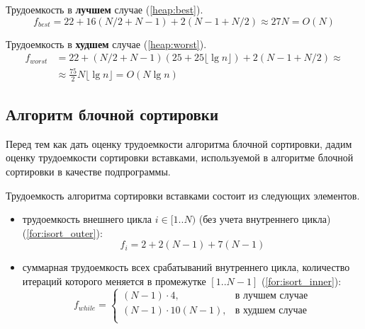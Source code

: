 Трудоемкость в \textbf{лучшем} случае (\ref{heap:best}).
\begin{equation}
	\label{heap:best}
	f_{best} = 22 + 16(N/2 + N - 1) + 2(N-1+N/2) \approx 27N = O(N)
\end{equation}

Трудоемкость в \textbf{худшем} случае (\ref{heap:worst}).
\begin{equation}
	\begin{split}
		\label{heap:worst}
		f_{worst} &=  22 + (N/2 + N - 1)(25 + 25\lfloor \lg{n}\rfloor) + 2(N-1+N/2)
		\approx \\&\approx \frac{75}{2}N\lfloor \lg{n}\rfloor = O(N\lg{n})
	\end{split}
\end{equation}

\subsection{Алгоритм блочной сортировки}

Перед тем как дать оценку трудоемкости алгоритма блочной сортировки, дадим оценку трудоемкости сортировки вставками, используемой в алгоритме блочной сортировки в качестве подпрограммы.

Трудоемкость алгоритма сортировки вставками состоит из следующих элементов.
\begin{itemize}
	\item трудоемкость внешнего цикла $i \in [1..N)$ (без учета внутреннего цикла)(\ref{for:isort_outer}):
	\begin{equation}
		\label{for:isort_outer}
		f_{i} = 2 + 2(N - 1) + 7(N-1)
	\end{equation}
	\item суммарная трудоемкость всех срабатываний внутреннего цикла, количество итераций которого меняется в промежутке $[1..N-1]$ (\ref{for:isort_inner}):
	\begin{equation}
		\label{for:isort_inner}
		f_{while} = \begin{cases}
			(N-1)\cdot4, & \text{в лучшем случае}\\
			(N-1)\cdot10(N - 1), & \text{в худшем случае}\\
		\end{cases}
	\end{equation}
	
\end{itemize}

